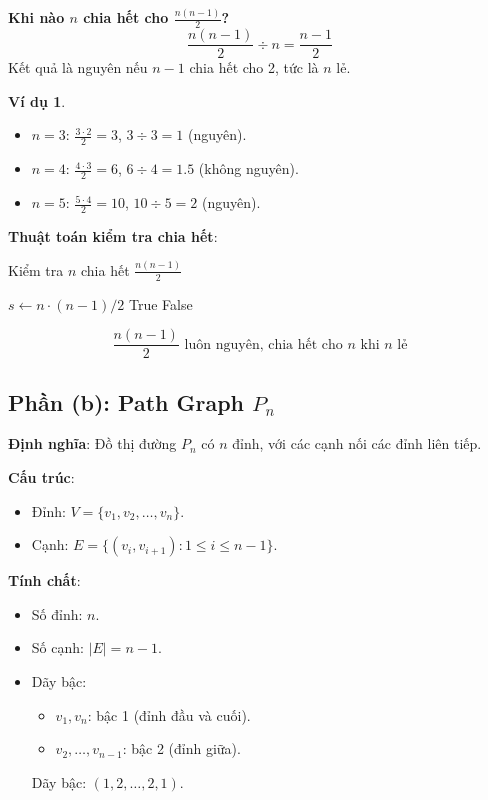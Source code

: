\documentclass[a4paper,12pt]{article}
\theoremstyle{plain}
\theoremstyle{definition}
\newtheorem{example}{Ví dụ}
\begin{document}
\textbf{Khi nào \( n \) chia hết cho \( \frac{n(n-1)}{2} \)?}
\[
\frac{n(n-1)}{2} \div n = \frac{n-1}{2}
\]
Kết quả là nguyên nếu \( n-1 \) chia hết cho 2, tức là \( n \) lẻ.

\begin{example}
\begin{itemize}
    \item \( n=3 \): \( \frac{3 \cdot 2}{2} = 3 \), \( 3 \div 3 = 1 \) (nguyên).
    \item \( n=4 \): \( \frac{4 \cdot 3}{2} = 6 \), \( 6 \div 4 = 1.5 \) (không nguyên).
    \item \( n=5 \): \( \frac{5 \cdot 4}{2} = 10 \), \( 10 \div 5 = 2 \) (nguyên).
\end{itemize}
\end{example}

\textbf{Thuật toán kiểm tra chia hết}:
\begin{algorithm}
\caption{Kiểm tra \( n \) chia hết \( \frac{n(n-1)}{2} \)}
\begin{algorithmic}
    \State $s \gets n \cdot (n-1) / 2$
     \Return True
    \Else \Return False
    \EndIf
\EndFunction
\end{algorithmic}
\end{algorithm}

\[
\boxed{\frac{n(n-1)}{2} \text{ luôn nguyên, chia hết cho } n \text{ khi } n \text{ lẻ}}
\]

\subsection*{Phần (b): Path Graph \( P_n \)}

\textbf{Định nghĩa}: Đồ thị đường \( P_n \) có \( n \) đỉnh, với các cạnh nối các đỉnh liên tiếp.

\textbf{Cấu trúc}:
\begin{itemize}
    \item Đỉnh: \( V = \{v_1, v_2, \ldots, v_n\} \).
    \item Cạnh: \( E = \{(v_i, v_{i+1}) : 1 \leq i \leq n-1\} \).
\end{itemize}

\textbf{Tính chất}:
\begin{itemize}
    \item Số đỉnh: \( n \).
    \item Số cạnh: \( |E| = n-1 \).
    \item Dãy bậc:
    \begin{itemize}
        \item \( v_1, v_n \): bậc 1 (đỉnh đầu và cuối).
        \item \( v_2, \ldots, v_{n-1} \): bậc 2 (đỉnh giữa).
    \end{itemize}
    Dãy bậc: \( (1, 2, \ldots, 2, 1) \).
\end{itemize}
\end{document}
